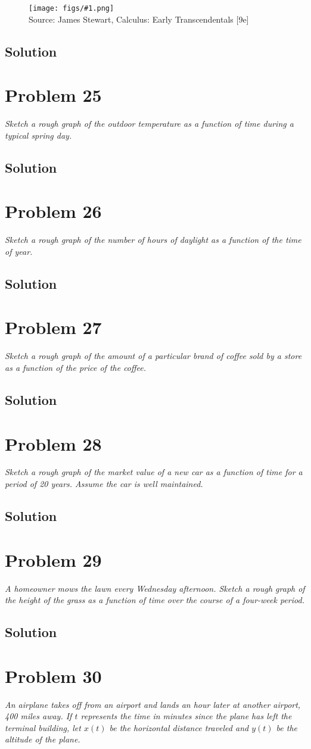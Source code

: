 \documentclass[11pt]{article}
\newcommand{\soln}{\subsection*}
\newcommand{\qn}{\textit}
\newcommand{\imagesource}[1]{{\footnotesize Source: #1}}
\newcommand{\imgqn}[1]{
	\begin{figure}[h]
		\centering
		\texttt{[image: figs/\#1.png]}\\
		\imagesource{James Stewart, Calculus: Early Transcendentals [9e]}
	\end{figure}
}
\begin{document}
\imgqn{1.1.24}

\soln{Solution}

\section*{Problem 25}

\qn{Sketch a rough graph of the outdoor temperature as a function of time during a typical spring day.}

\soln{Solution}

\section*{Problem 26}

\qn{Sketch a rough graph of the number of hours of daylight as a function of the time of year.}

\soln{Solution}

\section*{Problem 27}

\qn{Sketch a rough graph of the amount of a particular brand of coffee sold by a store as a function of the price of the coffee.}

\soln{Solution}

\section*{Problem 28}

\qn{Sketch a rough graph of the market value of a new car as a function of time for a period of 20 years. Assume the car is well maintained.}

\soln{Solution}

\section*{Problem 29}

\qn{A homeowner mows the lawn every Wednesday afternoon. Sketch a rough graph of the height of the grass as a function of time over the course of a four-week period.}

\soln{Solution}

\section*{Problem 30}

\qn{An airplane takes off from an airport and lands an hour later at another airport, 400 miles away. If $t$ represents the time in minutes since the plane has left the terminal building, let $x(t)$ be the horizontal distance traveled and $y(t)$ be the altitude of the plane.}
\end{document}
